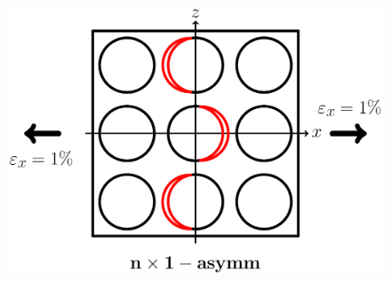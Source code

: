 \documentclass[first,firstsupp,lastsupp,last,hyperref,table]{ETHclass}
\begin{document}
\begin{frame}
\begin{columns}
\begin{column}{0.35\textwidth}
\begin{figure}
\end{figure}
\vspace{-0.5cm}
\begin{figure}
\centering
\includegraphics[width=\columnwidth]{twofibers-oppositeside-dtheta80.pdf}
\end{figure}
\end{column}
\end{columns}
\end{frame}

\addtocounter{framenumber}{-1}
\end{document}
